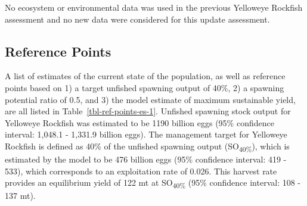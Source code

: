 \documentclass[
]{scrartcl}
\begin{document}
No ecosystem or environmental data was used in the previous Yelloweye
Rockfish assessment and no new data were considered for this update
assessment.

\subsection*{Reference Points}\label{reference-points}

A list of estimates of the current state of the population, as well as
reference points based on 1) a target unfished spawning output of 40\%,
2) a spawning potential ratio of 0.5, and 3) the model estimate of
maximum sustainable yield, are all listed in
Table~\ref{tbl-ref-points-es-1}. Unfished spawning stock output for
Yelloweye Rockfish was estimated to be 1190 billion eggs (95\%
confidence interval: 1,048.1 - 1,331.9 billion eggs). The management
target for Yelloweye Rockfish is defined as 40\% of the unfished
spawning output (SO\textsubscript{40\%}), which is estimated by the
model to be 476 billion eggs (95\% confidence interval: 419 - 533),
which corresponds to an exploitation rate of 0.026. This harvest rate
provides an equilibrium yield of 122 mt at SO\textsubscript{40\%} (95\%
confidence interval: 108 - 137 mt).

\clearpage

\begingroup
\fontsize{9.0pt}{10.8pt}\selectfont
\end{document}
